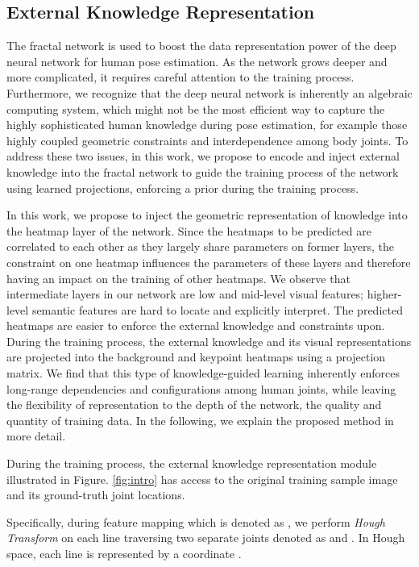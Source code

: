 \documentclass[journal ]{IEEEtran}
\begin{document}
\subsection{External Knowledge Representation}
\label{sec:guided-learning}

The fractal network is used to boost the data representation power of the deep neural network for human pose estimation. As the network grows deeper and more complicated, it requires careful attention to the training process. Furthermore, we recognize that the deep neural network is inherently an algebraic computing system, which might not be the most efficient way to capture the highly sophisticated human knowledge during pose estimation, for example those highly coupled geometric constraints and interdependence among body joints. To address these two issues, in this work, we propose to encode and inject external knowledge into the fractal network to guide the training process of the network using learned projections, enforcing a prior during the training process.

In this work, we propose to inject the geometric representation of knowledge into the heatmap layer of the network. 
Since the heatmaps to be predicted are correlated to each other as they largely share parameters on former layers, the constraint on one heatmap influences the parameters of these layers and therefore having an impact on the training of other heatmaps. We observe that intermediate layers in our network are low and mid-level visual features; higher-level semantic features are hard to locate and explicitly interpret. 
The predicted heatmaps are easier to enforce the external knowledge and constraints upon. 
During the training process, the external knowledge and its visual representations are projected into the background and keypoint heatmaps using a projection matrix. We find that this type of knowledge-guided learning inherently enforces long-range dependencies and configurations among human joints, while leaving the flexibility of representation to the depth of the network, the quality and quantity of training data. In the following, we explain the proposed method in more detail.

During the training process, the external knowledge representation module illustrated in Figure. \ref{fig:intro} has access to the original training sample image and its ground-truth joint locations.

Specifically, during feature mapping which is denoted as , we perform \textit{Hough Transform} on each line traversing two separate joints denoted as  and . In Hough space, each line is represented by a coordinate .
\end{document}
